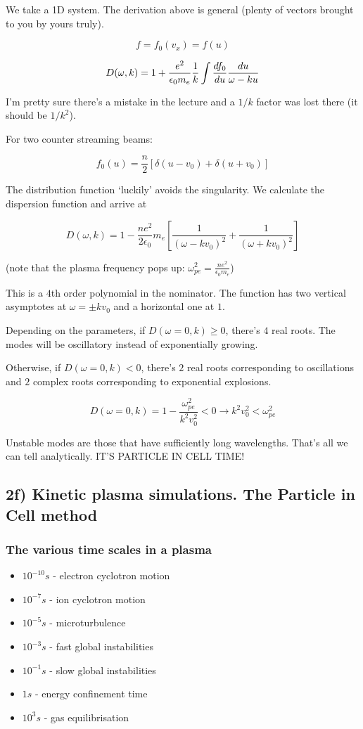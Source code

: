 We take a 1D system. The derivation above is general (plenty of vectors brought to you by yours truly). 

\[f=f_0(v_x) = f(u)\]

\[ D(\omega, k) = 1 + \frac{e^2}{\epsilon_0 m_e} \frac{1}{k} \int \frac{d f_0}{d u} \frac{du}{\omega-k u} \]

I'm pretty sure there's a mistake in the lecture and a $1/k$ factor was lost there (it should be $1/k^2$).

For two counter streaming beams:

\[ f_0 (u) =\frac{n}{2} [\delta(u-v_0) + \delta(u+v_0)] \]

The distribution function `luckily' avoids the singularity. We calculate the dispersion function and arrive at

\[D(\omega, k) = 1- \frac{n e^2}{2 \epsilon_0}{m_e} [\frac{1}{(\omega-k v_0)^2} + \frac{1}{(\omega + k v_0)^2} ] \]

(note that the plasma frequency pops up: $\omega^2_{pe} = \frac{n e^2}{\epsilon_0 m_e}$)

This is a $4$th order polynomial in the nominator. The function has two vertical asymptotes at $\omega = \pm k v_0$ and a horizontal one at $1$.

Depending on the parameters, if $D(\omega=0, k) \geq 0$, there's $4$ real roots. The modes will be oscillatory instead of exponentially growing.

Otherwise, if $D(\omega = 0, k) < 0$, there's $2$ real roots corresponding to oscillations and $2$ complex roots corresponding to exponential explosions.

\[ D(\omega =0, k) = 1 - \frac{\omega_{pe}^2}{k^2 v_0^2} < 0 \rightarrow k^2 v_0^2 < \omega_{pe}^2 \]

Unstable modes are those that have sufficiently long wavelengths. That's all we can tell analytically. IT'S PARTICLE IN CELL TIME!

\subsection{2f) Kinetic plasma simulations. The Particle in Cell method}
\subsubsection{The various time scales in a plasma}

\begin{itemize}
\item $10^{-10}s$ - electron cyclotron motion
\item $10^{-7}s$ - ion cyclotron motion
\item $10^{-5}s$ - microturbulence
\item $10^{-3}s$ - fast global instabilities
\item $10^{-1}s$ - slow global instabilities
\item $1s$ - energy confinement time
\item $10^3s$ - gas equilibrisation
\end{itemize}

